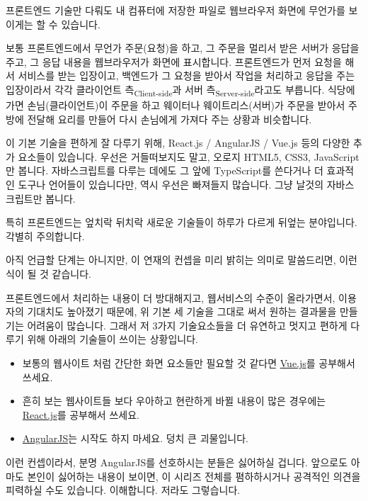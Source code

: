 \documentclass[11pt,a4paper]{article}
\begin{document}
프론트엔드 기술만 다뤄도 내 컴퓨터에 저장한 파일로 웹브라우저 화면에 무언가를 보이게는 할 수 있습니다.

보통 프론트엔드에서 무언가 주문(요청)을 하고, 그 주문을 멀리서 받은 서버가 응답을 주고, 그 응답 내용을 웹브라우저가 화면에 표시합니다. 프론트엔드가 먼저 요청을 해서 서비스를 받는 입장이고, 백엔드가 그 요청을 받아서 작업을 처리하고 응답을 주는 입장이라서 각각 클라이언트 측\textsubscript{Client-side}과 서버 측\textsubscript{Server-side}라고도 부릅니다. 식당에 가면 손님(클라이언트)이 주문을 하고 웨이터나 웨이트리스(서버)가 주문을 받아서 주방에 전달해 요리를 만들어 다시 손님에게 가져다 주는 상황과 비슷합니다.

이 기본 기술을 편하게 잘 다루기 위해, \textsf{React.js / AngularJS / Vue.js} 등의 다양한 추가 요소들이 있습니다. 우선은 거들떠보지도 말고, 오로지 \textsf{HTML5, CSS3,  JavaScript}만 봅니다. 자바스크립트를 다루는 데에도 그 앞에 \textsf{TypeScript}를 쓴다거나 더 효과적인 도구나 언어들이 있습니다만, 역시 우선은 빠져들지 많습니다. 그냥 날것의 자바스크립트만 봅니다.

특히 프론트엔드는 엎치락 뒤치락 새로운 기술들이 하루가 다르게 뒤엎는 분야입니다. 각별히 주의합니다.

아직 언급할 단계는 아니지만, 이 연재의 컨셉을 미리 밝히는 의미로 말씀드리면, 이런식이 될 것 같습니다.

프론트엔드에서 처리하는 내용이 더 방대해지고, 웹서비스의 수준이 올라가면서, 이용자의 기대치도 높아졌기 때문에, 위 기본 세 기술을 그대로 써서 원하는 결과물을 만들기는 어려움이 많습니다. 그래서 저 3가지 기술요소들을 더 유연하고 멋지고 편하게 다루기 위해 아래의 기술들이 쓰이는 상황입니다.

\begin{itemize}
\item 보통의 웹사이트 처럼 간단한 화면 요소들만 필요할 것 같다면 \href{https://vuejs.org}{Vue.js}를 공부해서 쓰세요.
\item 흔히 보는 웹사이트들 보다 우아하고 현란하게 바뀔 내용이 많은 경우에는 \href{https://facebook.github.io/react}{React.js}를 공부해서 쓰세요.
\item \href{https://angularjs.org}{AngularJS}는 시작도 하지 마세요. 덩치 큰 괴물입니다.
\end{itemize}

이런 컨셉이라서, 분명 \textsf{AngularJS}를 선호하시는 분들은 싫어하실 겁니다. 앞으로도 아마도 본인이 싫어하는 내용이 보이면, 이 시리즈 전체를 폄하하시거나 공격적인 의견을 피력하실 수도 있습니다. 이해합니다. 저라도 그렇습니다.
\end{document}
